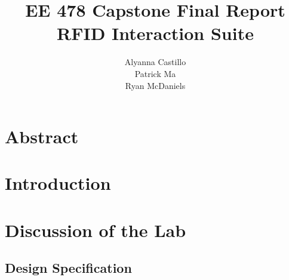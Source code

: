 \documentclass[12pt]{article} %
\title{\TitleFont EE 478 Capstone Final Report \\ RFID Interaction Suite \vfill }
\author{\AuthorFont Alyanna Castillo \\ Patrick Ma \\ Ryan McDaniels}
\date{}
\begin{document}
\maketitle
\thispagestyle{empty}
\pagebreak
\tableofcontents
\listoftables
\listoffigures
\thispagestyle{empty}
\pagebreak
\setcounter{page}{1}

\section{Abstract}
% 
 
\section{Introduction}

\section{Discussion of the Lab}


\subsection{Design Specification}

\end{document}
